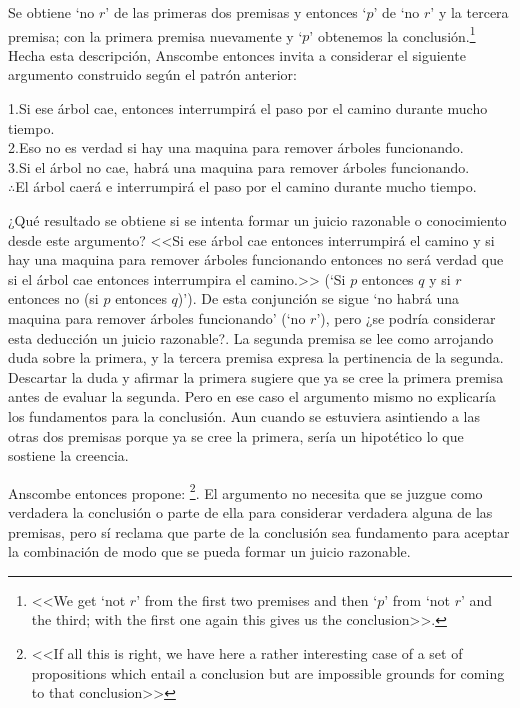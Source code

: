   Se obtiene `no $r$' de las primeras dos premisas y entonces `$p$' de `no $r$'
  y la tercera premisa; con la primera premisa nuevamente y `$p$' obtenemos la
  conclusión.{\footnote{\cite[299]{anscombe2015logic:qpa} <<We get `not $r$'
      from the first two premises and then `$p$' from `not $r$' and the third;
      with the first one again this gives us the conclusion>>.}} Hecha esta
  descripción, Anscombe entonces invita a considerar el siguiente argumento
  construido según el patrón anterior:
  \begin{adjustwidth}{1.2cm}{}
    1.\hspace{.5cm}Si ese árbol cae, entonces interrumpirá el paso por el camino
    durante mucho tiempo.\\
    2.\hspace{.5cm}Eso no es verdad si hay una maquina para remover árboles
    funcionando.\\
    3.\hspace{.5cm}Si el árbol no cae, habrá una maquina para remover árboles
    funcionando.\\
    $\therefore$\hspace{.5cm}El árbol caerá e interrumpirá el paso por el camino
    durante mucho tiempo.
  \end{adjustwidth}

  ¿Qué resultado se obtiene si se intenta formar un juicio razonable o
  conocimiento desde este argumento? <<Si ese árbol cae entonces interrumpirá el
  camino y si hay una maquina para remover árboles funcionando entonces no será
  verdad que si el árbol cae entonces interrumpira el camino.>> (`Si $p$
  entonces $q$ y si $r$ entonces no (si $p$ entonces $q$)'). De esta conjunción
  se sigue `no habrá una maquina para remover árboles funcionando' (`no $r$'),
  pero ¿se podría considerar esta deducción un juicio razonable?. La segunda
  premisa se lee como arrojando duda sobre la primera, y la tercera premisa
  expresa la pertinencia de la segunda. Descartar la duda y afirmar la primera
  sugiere que ya se cree la primera premisa antes de evaluar la segunda. Pero en
  ese caso el argumento mismo no explicaría los fundamentos para la conclusión.
  Aun cuando se estuviera asintiendo a las otras dos premisas porque ya se cree
  la primera, sería un hipotético lo que sostiene la
  creencia\autocite[Cf.~][300]{anscombe2015logic:qpa}.

  Anscombe entonces propone: \footnote{\cite[300]{anscombe2015logic:qpa} <<If all this is
    right, we have here a rather interesting case of a set of propositions which
    entail a conclusion but are impossible grounds for coming to that
    conclusion>>}. El argumento no necesita que se juzgue como verdadera la
  conclusión o parte de ella para considerar verdadera alguna de las premisas,
  pero sí reclama que parte de la conclusión sea fundamento para aceptar la
  combinación de modo que se pueda formar un juicio
  razonable\autocite[Cf.~][301]{anscombe2015logic:qpa}.

